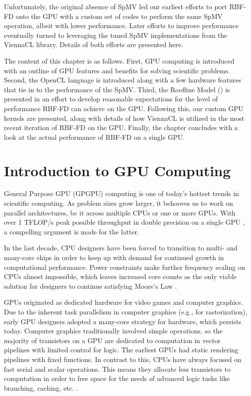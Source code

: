 \documentclass{report}
\begin{document}
Unfortunately, the original absence of SpMV led our earliest efforts to port RBF-FD onto the GPU with a custom set of codes to perform the same SpMV operation, albeit with lower performance. Later efforts to improve performance eventually turned to leveraging the tuned SpMV implementations from the ViennaCL library. Details of both efforts are presented here. 

The content of this chapter is as follows. First, GPU computing is introduced with an outline of GPU features and benefits for solving scientific problems. Second, the OpenCL language is introduced along with a few hardware features that tie in to the performance of the SpMV. Third, the Roofline Model (\cite{Williams2009}) is presented in an effort to develop reasonable  expectations for the level of performance RBF-FD can achieve on the GPU. Following this, our custom GPU kernels are presented, along with details of how ViennaCL is utilized in the most recent iteration of RBF-FD on the GPU. Finally, the chapter concludes with a look at the actual performance of RBF-FD on a single GPU. 

\section{Introduction to GPU Computing} 

General Purpose GPU (GPGPU) computing is one of today's hottest trends in scientific computing. As problem sizes grow larger, it behooves us to work on parallel architectures, be it across multiple CPUs or one or more GPUs. With over 1 TFLOP/s peak possible throughput in double precision on a single GPU \cite{KeplerFactSheet}, a compelling argument is made for the latter. 

In the last decade, CPU designers have been forced to transition to multi- and many-core chips in order to keep up with demand for continued growth in computational performance. Power constraints make further frequency scaling on CPUs almost impossible, which leaves increased core counts as the only viable solution for designers to continue satisfying Moore's Law \cite{Owens2007}. 


GPUs originated as dedicated hardware for video games and computer graphics. 
Due to the inherent task parallelism in computer graphics  (e.g., for rasterization), early GPU designers adopted a many-core strategy for hardware, which persists today. Computer graphics traditionally involved simple operations, so the majority of transistors on a GPU are dedicated to computation in vector pipelines with limited control for logic. The earliest GPUs had static rendering pipelines with fixed functions. In contrast to this, CPUs have always focused on fast serial and scalar operations. This means they allocate less transistors to computation in order to free space for the needs of advanced logic tasks like branching, caching, etc. \cite{Owens2007,CudaGuide2013}. %
\end{document}

